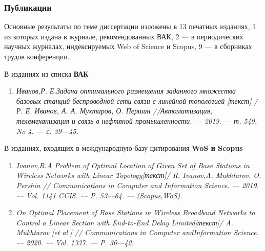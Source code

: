 \begin{frame}
    \frametitle{Публикации}
    \fontsize{8pt}{7.2}\selectfont

    Основные результаты по теме диссертации изложены в 13 печатных изданиях, 1 из которых издана в журнале, рекомендованных ВАК, 2 — в периодических научных журналах, индексируемых Web of Science и Scopus, 9 — в сборниках трудов конференции. 
    
    \bigskip
    
    В изданиях из списка \textbf{ВАК} 
    \begin{enumerate}
        \item \textit{Иванов,Р. Е.Задача оптимального размещения заданного множе­ства базовых станций беспроводной сети связи с линейной топо­логией [текст] / Р. Е. Иванов, А. А. Мухтаров, О. Першин //Автоматизация, телемеханизация и связь в нефтяной промышлен­ности. — 2019. — т. 549, No 4. — с. 39—45.}
    \end{enumerate}

    \bigskip

    В изданиях, входящих в международную базу цитирования \textbf{WoS и Scopus}

    \begin{enumerate}
        \item \textit{Ivanov,R.A Problem of Optimal Location of Given Set of Base Sta­tions in Wireless Networks with Linear Topology[текст]/ R. Ivanov,A. Mukhtarov, O. Pershin // Communications in Computer and Infor­mation Science. –– 2019. –– Vol. 1141 CCIS. –– P. 53––64. –– (Scopus,WoS).}
        \item  \textit{On Optimal Placement of Base Stations in Wireless Broadband Net­works to Control a Linear Section with End-to-End Delay Limited[текст]/ A. Mukhtarov [et al.] // Communications in Computer andInformation Science. –– 2020. –– Vol. 1337. –– P. 30––42.}
    \end{enumerate}

    \bigskip
\end{frame}

